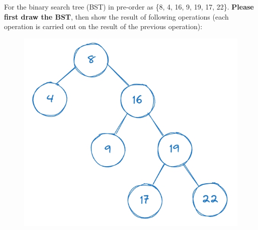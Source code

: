 \noindent {}
For the binary search tree (BST) in pre-order as \{8, 4, 16, 9, 19, 17, 22\}. \textbf{Please first draw the BST}, then show the result of following operations (each operation is carried out on the result of the previous
operation):
\begin{figure}[!h]
    \centering
    \includegraphics[width=0.4\linewidth]{HWs/HW6/figures/4-1.png}
\end{figure}

